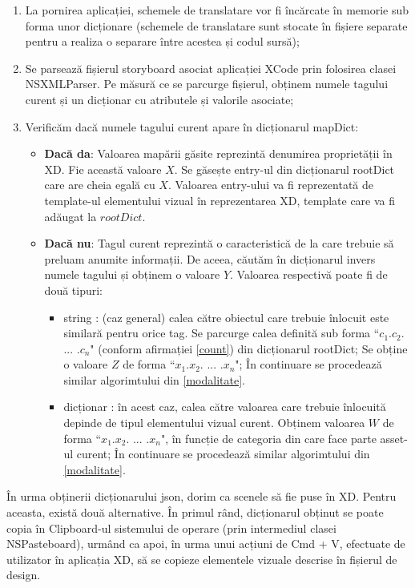 \begin{enumerate}
\item La pornirea aplicației, schemele de translatare vor fi încărcate în memorie sub forma unor dicționare (schemele de translatare sunt stocate în fișiere separate pentru a realiza o separare între acestea și codul sursă);
\item Se parsează fișierul storyboard asociat aplicației XCode prin folosirea clasei NSXMLParser. Pe măsură ce se parcurge fișierul, obținem numele tagului curent și un dicționar cu atributele și valorile asociate;
\item Verificăm dacă numele tagului curent apare în dicționarul mapDict:
\begin{itemize}
\item \textbf{Dacă da}: Valoarea mapării găsite reprezintă denumirea proprietății în XD. Fie această valoare $X$. Se găsește entry-ul din dicționarul rootDict care are cheia egală cu $X$. Valoarea entry-ului va fi reprezentată de template-ul elementului vizual în reprezentarea XD, template care va fi adăugat la $rootDict$.
\item \textbf{Dacă nu}: Tagul curent reprezintă o caracteristică de la care trebuie să preluam anumite informații. De aceea, căutăm în dicționarul invers numele tagului și obținem o valoare $Y$. Valoarea respectivă poate fi de două tipuri:
\begin{itemize}
\item string : (caz general) calea către obiectul care trebuie înlocuit este similară pentru orice tag. Se parcurge calea definită sub forma ``$c_1$.$c_2$. ... .$c_n$" (conform afirmației \ref{count}) din dicționarul rootDict; Se obține o valoare $Z$ de forma ``$x_1$.$x_2$. ... .$x_n$"; În continuare se procedează similar algorimtului din \ref{modalitate}.
\item dicționar : în acest caz, calea către valoarea care trebuie înlocuită depinde de tipul elementului vizual curent. Obținem valoarea $W$ de forma ``$x_1$.$x_2$. ... .$x_n$", în funcție de categoria din care face parte asset-ul curent; În continuare se procedează similar algorimtului din \ref{modalitate}.
\end{itemize}
\end{itemize}
\end{enumerate}

În urma obținerii dicționarului json, dorim ca scenele să fie puse în XD. Pentru aceasta, există două alternative. În primul rând, dicționarul obținut se poate copia în Clipboard-ul sistemului de operare (prin intermediul clasei NSPasteboard), urmând ca apoi, în urma unui acțiuni de Cmd + V, efectuate de utilizator în aplicația XD, să se copieze elementele vizuale descrise în fișierul de design.

